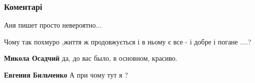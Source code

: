  
 
 
 
 
\subsubsection{Коментарі}
\label{sec:10_08_2021.fb.bilchenko_evgenia.1.anna_dolgareva_chernaja_zima.cmt}

\begin{itemize}
 
Аня пишет просто невероятно...

 
Чому так похмуро ,життя ж продовжується і в ньому є все - і добре і погане ....?

\begin{itemize}
 
\textbf{Микола Осадчий} да, до вас было, в основном, красиво.

 
\textbf{Евгения Бильченко} А при чому тут я ?

 

\end{itemize}
\end{itemize}
